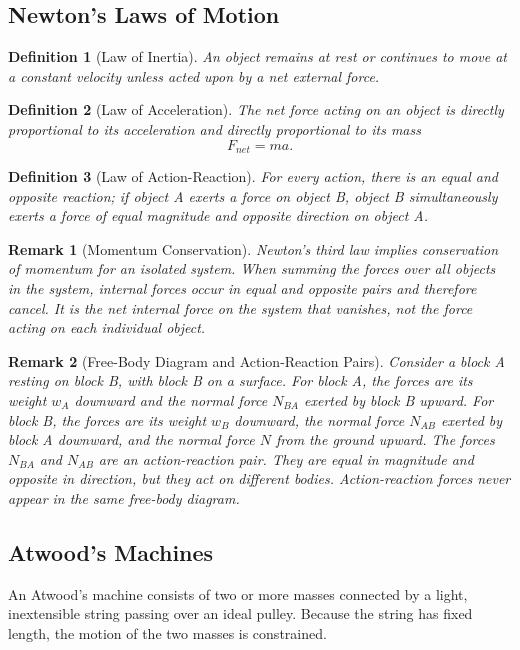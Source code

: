 \documentclass{article}
\newtheorem{definition}{Definition}
\newtheorem{remark}{Remark}
\begin{document}
\subsection{Newton's Laws of Motion}
\begin{definition}[Law of Inertia]
    An object remains at rest or continues to move at a constant velocity unless acted upon by a net external force.
\end{definition}
\begin{definition}[Law of Acceleration]
    The net force acting on an object is directly proportional to its acceleration and directly proportional to its mass
    \[F_{net} = ma.\]
\end{definition}
\begin{definition}[Law of Action-Reaction]
    For every action, there is an equal and opposite reaction; if object A exerts a force on object B, object B simultaneously exerts a force of equal magnitude and opposite direction on object A.
\end{definition}
\begin{remark}[Momentum Conservation]
    Newton's third law implies conservation of momentum for an isolated system. When summing the forces over all objects in the system, internal forces occur in equal and opposite pairs and therefore cancel. It is the net internal force on the system that vanishes, not the force acting on each individual object.
\end{remark}
\begin{remark}[Free-Body Diagram and Action-Reaction Pairs]
    Consider a block A resting on block B, with block B on a surface. For block A, the forces are its weight $w_A$ downward and the normal force $N_{BA}$ exerted by block B upward. For block B, the forces are its weight $w_B$ downward, the normal force $N_{AB}$ exerted by block A downward, and the normal force $N$ from the ground upward. The forces $N_{BA}$ and $N_{AB}$ are an action-reaction pair. They are equal in magnitude and opposite in direction, but they act on different bodies. Action-reaction forces never appear in the same free-body diagram.
\end{remark}

\subsection{Atwood's Machines}
An Atwood's machine consists of two or more masses connected by a light, inextensible string passing over an ideal pulley. Because the string has fixed length, the motion of the two masses is constrained.
\end{document}
